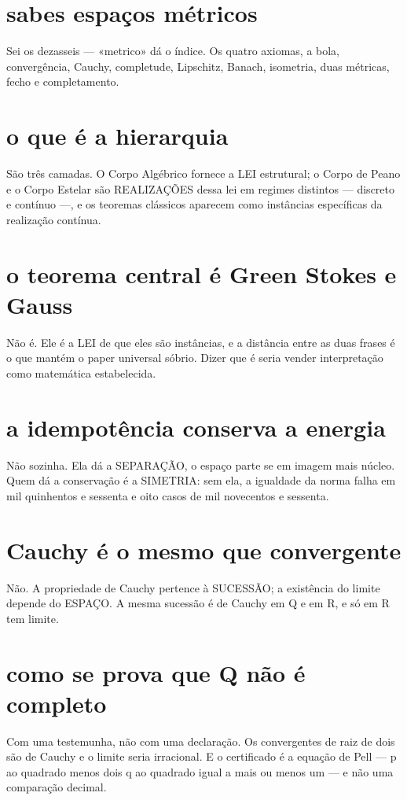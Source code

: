 \documentclass[11pt,a4paper]{article}
\begin{document}
\section{sabes espaços métricos}
Sei os dezasseis — «metrico» dá o índice. Os quatro axiomas, a bola, convergência,
Cauchy, completude, Lipschitz, Banach, isometria, duas métricas, fecho e completamento.

\section{o que é a hierarquia}
São três camadas. O Corpo Algébrico fornece a LEI estrutural; o Corpo de Peano e o Corpo
Estelar são REALIZAÇÕES dessa lei em regimes distintos — discreto e contínuo —, e os
teoremas clássicos aparecem como instâncias específicas da realização contínua.

\section{o teorema central é Green Stokes e Gauss}
Não é. Ele é a LEI de que eles são instâncias, e a distância entre as duas frases é o que
mantém o paper universal sóbrio. Dizer que é seria vender interpretação como matemática
estabelecida.

\section{a idempotência conserva a energia}
Não sozinha. Ela dá a SEPARAÇÃO, o espaço parte se em imagem mais núcleo. Quem dá a
conservação é a SIMETRIA: sem ela, a igualdade da norma falha em mil quinhentos e sessenta
e oito casos de mil novecentos e sessenta.

\section{Cauchy é o mesmo que convergente}
Não. A propriedade de Cauchy pertence à SUCESSÃO; a existência do limite depende do
ESPAÇO. A mesma sucessão é de Cauchy em Q e em R, e só em R tem limite.

\section{como se prova que Q não é completo}
Com uma testemunha, não com uma declaração. Os convergentes de raiz de dois são de Cauchy
e o limite seria irracional. E o certificado é a equação de Pell — p ao quadrado menos
dois q ao quadrado igual a mais ou menos um — e não uma comparação decimal.
\end{document}
